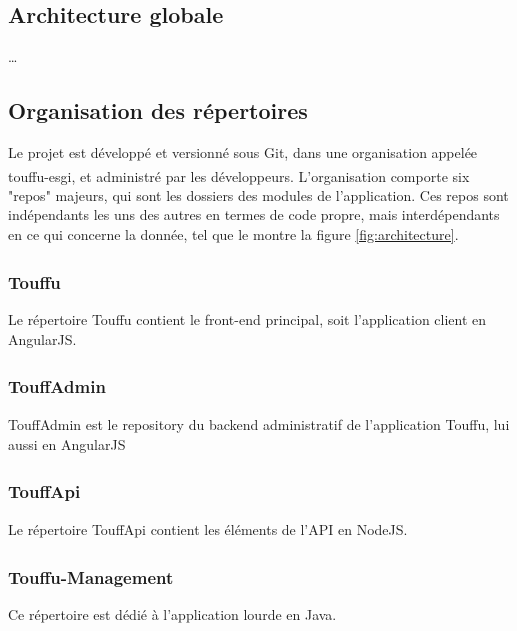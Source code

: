 \documentclass[conference]{IEEEtran}
\newcommand{\bibRef}[1]
{\textsuperscript{\cite{#1}}}
\begin{document}
\subsection{Architecture globale}

…

\subsection{Organisation des répertoires}

Le projet est développé et versionné sous Git, dans une organisation appelée touffu-esgi\bibRef{touffu-esgi}, et administré par les développeurs. L'organisation comporte six "repos" majeurs, qui sont les dossiers des modules de l'application. Ces repos sont indépendants les uns des autres en termes de code propre, mais interdépendants en ce qui concerne la donnée, tel que le montre la figure \ref{fig:architecture}.\\

\subsubsection*{Touffu\bibRef{Touffu} }

Le répertoire Touffu contient le front-end principal, soit l'application client en AngularJS.\\

\subsubsection*{TouffAdmin\bibRef{TouffAdmin} }

TouffAdmin est le repository du backend administratif de l'application Touffu, lui aussi en AngularJS\\

\subsubsection*{TouffApi\bibRef{TouffApi} }

Le répertoire TouffApi contient les éléments de l'API en NodeJS.\\

\subsubsection*{Touffu-Management\bibRef{Touffu-Management} }

Ce répertoire est dédié à l'application lourde en Java.\\
\end{document}

